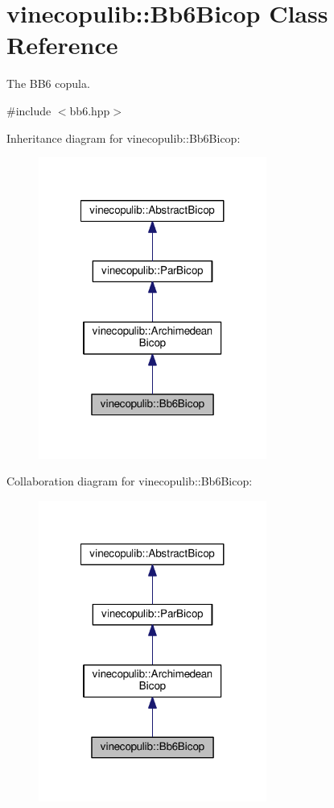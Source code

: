 \hypertarget{classvinecopulib_1_1_bb6_bicop}{\section{vinecopulib\+:\+:Bb6\+Bicop Class Reference}
\label{classvinecopulib_1_1_bb6_bicop}
}


The B\+B6 copula.  




{\ttfamily \#include $<$bb6.\+hpp$>$}



Inheritance diagram for vinecopulib\+:\+:Bb6\+Bicop\+:\nopagebreak
\begin{figure}[H]
\begin{center}
\leavevmode
\includegraphics[width=212pt]{classvinecopulib_1_1_bb6_bicop__inherit__graph}
\end{center}
\end{figure}


Collaboration diagram for vinecopulib\+:\+:Bb6\+Bicop\+:\nopagebreak
\begin{figure}[H]
\begin{center}
\leavevmode
\includegraphics[width=212pt]{classvinecopulib_1_1_bb6_bicop__coll__graph}
\end{center}
\end{figure}
